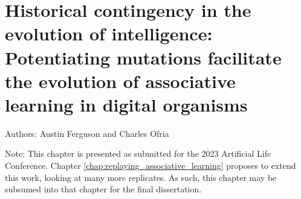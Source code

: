 \chapter{Historical contingency in the evolution of intelligence: Potentiating mutations facilitate the evolution of associative learning in digital organisms}
\label{chap:alife_submission}

\noindent
Authors: Austin Ferguson and Charles Ofria

\noindent
Note: This chapter is presented as submitted for the 2023 Artificial Life Conference.
Chapter \ref{chap:replaying_associative_learning} proposes to extend this work, looking at many more replicates. 
As such, this chapter may be subsumed into that chapter for the final dissertation. 









%


% 

%


%

